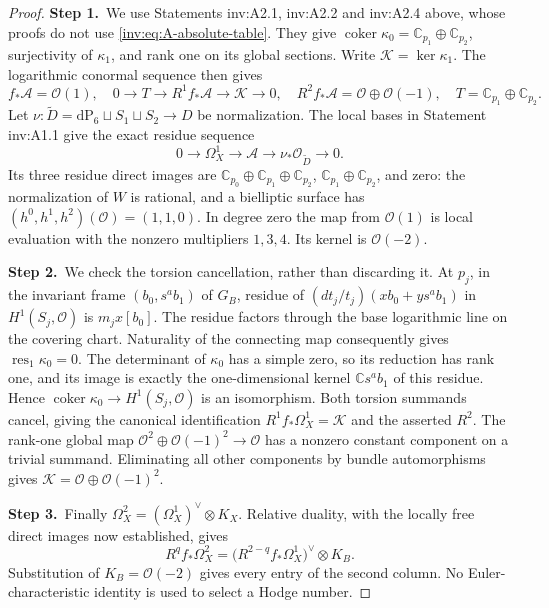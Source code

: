 \documentclass[11pt,a4paper]{article}
\theoremstyle{plain}
\theoremstyle{definition}
\DeclareMathOperator{\coker}{coker}
\begin{document}
\begin{proof}
\par\smallskip\noindent\textbf{Step 1.}\ We use Statements inv:A2.1, inv:A2.2 and inv:A2.4 above, whose proofs do not use
\eqref{inv:eq:A-absolute-table}.  They give
$\coker\kappa_0=\mathbb C_{p_1}\oplus\mathbb C_{p_2}$,
surjectivity of $\kappa_1$, and rank one on its global sections.
Write $\mathcal K=\ker\kappa_1$.  The logarithmic conormal sequence
then gives
\[
f_*\mathcal A=\mathcal O(1),\quad
0\to T\to R^1f_*\mathcal A\to\mathcal K\to0,\quad
R^2f_*\mathcal A=\mathcal O\oplus\mathcal O(-1),
\quad T=\mathbb C_{p_1}\oplus\mathbb C_{p_2}.
\]
Let $\nu:\widetilde D=\mathrm{dP}_6\sqcup S_1\sqcup S_2\to D$
be normalization.  The local bases in Statement inv:A1.1 give the exact
residue sequence
\[
0\to\Omega_X^1\to\mathcal A\to\nu_*\mathcal O_{\widetilde D}\to0.
\]
Its three residue direct images are
$\mathbb C_{p_0}\oplus\mathbb C_{p_1}\oplus\mathbb C_{p_2}$,
$\mathbb C_{p_1}\oplus\mathbb C_{p_2}$, and zero: the normalization of $W$ is
rational, and a bielliptic surface has $(h^0,h^1,h^2)(\mathcal O)=(1,1,0)$.
In degree zero the map from $\mathcal O(1)$ is local evaluation with the
nonzero multipliers $1,3,4$.  Its kernel is $\mathcal O(-2)$.

\par\smallskip\noindent\textbf{Step 2.}\ We check the torsion cancellation, rather than discarding it.  At
$p_j$, in the invariant frame $(b_0,s^ab_1)$ of $G_B$, residue of
$(dt_j/t_j)(x b_0+y s^ab_1)$ in $H^1(S_j,\mathcal O)$ is $m_jx[b_0]$.
The residue factors through the base logarithmic line on the covering
chart.  Naturality of the connecting map consequently gives
$\operatorname{res}_1\kappa_0=0$.  The determinant of $\kappa_0$
has a simple zero, so its reduction has rank one, and its image is
exactly the one-dimensional kernel $\mathbb C s^ab_1$ of this residue.
Hence $\coker\kappa_0\to H^1(S_j,\mathcal O)$ is an isomorphism.
Both torsion summands cancel, giving the canonical identification
$R^1f_*\Omega_X^1=\mathcal K$ and the asserted $R^2$.
The rank-one global map
$\mathcal O^2\oplus\mathcal O(-1)^2\to\mathcal O$ has a nonzero constant component
on a trivial summand.  Eliminating all other components by bundle
automorphisms gives
$\mathcal K=\mathcal O\oplus\mathcal O(-1)^2$.

\par\smallskip\noindent\textbf{Step 3.}\ Finally $\Omega_X^2=(\Omega_X^1)^\vee\otimes K_X$.  Relative
duality, with the locally free direct images now established, gives
\[
R^qf_*\Omega_X^2
=\bigl(R^{2-q}f_*\Omega_X^1\bigr)^\vee\otimes K_B.
\]
Substitution of $K_B=\mathcal O(-2)$ gives every entry of the second column.
No Euler-characteristic identity is used to select a Hodge number.
\end{proof}
\end{document}
